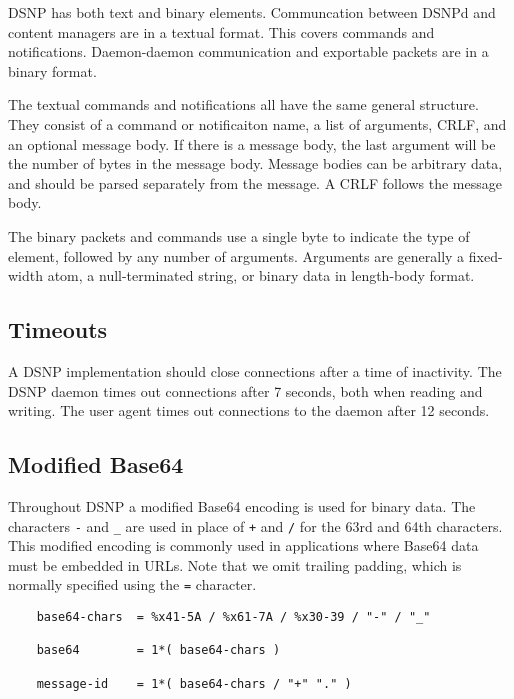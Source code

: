 \documentclass[letterpaper,11pt,oneside]{article}
\begin{document}
DSNP has both text and binary elements. Communcation between DSNPd and content
managers are in a textual format. This covers commands and notifications.
Daemon-daemon communication and exportable packets are in a binary format.

The textual commands and notifications all have the same general structure.
They consist of a command or notificaiton name, a list of arguments, CRLF, and
an optional message body. If there is a message body, the last argument will be
the number of bytes in the message body. Message bodies can be arbitrary data,
and should be parsed separately from the message. A CRLF follows the message
body.

The binary packets and commands use a single byte to indicate the type of
element, followed by any number of arguments. Arguments are generally a
fixed-width atom, a null-terminated string, or binary data in length-body
format.

\subsection{Timeouts}

A DSNP implementation should close connections after a time of inactivity. The
DSNP daemon times out connections after 7 seconds, both when reading and
writing. The user agent times out connections to the daemon after 12 seconds.

\subsection{Modified Base64}

Throughout DSNP a modified Base64 encoding is used for binary data. The
characters \verb|-| and \verb|_| are used in place of \verb|+| and \verb|/| for
the 63rd and 64th characters. This modified encoding is commonly used in
applications where Base64 data must be embedded in URLs. Note that we omit
trailing padding, which is normally specified using the \verb|=| character.

\vspace{10pt}
\begin{verbatim}
    base64-chars  = %x41-5A / %x61-7A / %x30-39 / "-" / "_"

    base64        = 1*( base64-chars )
    
    message-id    = 1*( base64-chars / "+" "." )
\end{verbatim}
\vspace{10pt}
\end{document}
